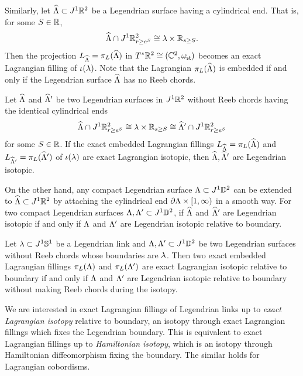 Similarly, let $\widehat{\Lambda}\subset J^1\mathbb{R}^2$ be a Legendrian surface having a cylindrical end. That is, for some $S\in \mathbb{R}$, 
\[
\widehat{\Lambda}\cap J^1\mathbb{R}^2_{r\ge e^S}\cong \lambda \times \mathbb{R}_{s\ge S}.
\]
Then the projection $L_{\widehat{\Lambda}}=\pi_L(\widehat{\Lambda})$ in 
$T^*\mathbb{R}^2\cong(\mathbb{C}^2, \omega_{\mathsf{st}})$ becomes an exact Lagrangian filling of $\iota(\lambda)$.
Note that the Lagrangian $\pi_L(\widehat{\Lambda})$ is embedded if and only if the Legendrian surface $\widehat{\Lambda}$ has no Reeb chords.

\begin{lemma}\label{lem:legendrian and lagrangian}
Let $\widehat{\Lambda}$ and $\widehat{\Lambda}'$ be two Legendrian surfaces in $J^1\mathbb{R}^2$ without Reeb chords having the identical cylindrical ends
\[
\widehat{\Lambda}\cap J^1\mathbb{R}^2_{r\ge e^S} \cong \lambda \times \mathbb{R}_{s\ge S}
\cong
\widehat{\Lambda}'\cap J^1\mathbb{R}^2_{r\ge e^S}
\]
for some $S\in\mathbb{R}$.
If the exact embedded Lagrangian fillings $L_{\widehat{\Lambda}}=\pi_L(\widehat{\Lambda})$ and $L_{\widehat{\Lambda}'}=\pi_L(\widehat{\Lambda}')$ of $\iota(\lambda)$ are exact Lagrangian isotopic, then $\widehat{\Lambda}, \widehat{\Lambda}'$ are Legendrian isotopic.
\end{lemma}

On the other hand, any compact Legendrian surface $\Lambda\subset J^1\mathbb{D}^2$ can be extended to $\widehat{\Lambda}\subset J^1\mathbb{R}^2$ by attaching the cylindrical end $\partial\Lambda\times[1,\infty)$ in a smooth way.
For two compact Legendrian surfaces $\Lambda, \Lambda'\subset J^1\mathbb{D}^2$, if $\widehat{\Lambda}$ and $\widehat{\Lambda}'$ are Legendrian isotopic if and only if $\Lambda$ and $\Lambda'$ are Legendrian isotopic relative to boundary.

\begin{corollary}
Let $\lambda\subset J^1\mathbb{S}^1$ be a Legendrian link and $\Lambda, \Lambda'\subset J^1\mathbb{D}^2$ be two Legendrian surfaces without Reeb chords whose boundaries are $\lambda$.
Then two exact embedded Lagrangian fillings $\pi_{L}(\Lambda)$ and $\pi_{L}(\Lambda')$ are exact Lagrangian isotopic relative to boundary if and only if $\Lambda$ and $\Lambda'$ are Legendrian isotopic relative to boundary without making Reeb chords during the isotopy.
\end{corollary}

\begin{remark}
We are interested in exact Lagrangian fillings of Legendrian links up to \emph{exact Lagrangian isotopy} relative to boundary, 
an isotopy through exact Lagrangian fillings which fixes the Legendrian boundary.
This is equivalent to exact Lagrangian fillings up to \emph{Hamiltonian isotopy}, which is an isotopy through Hamiltonian diffeomorphism fixing the boundary. The similar holds for Lagrangian cobordisms.
\end{remark}

